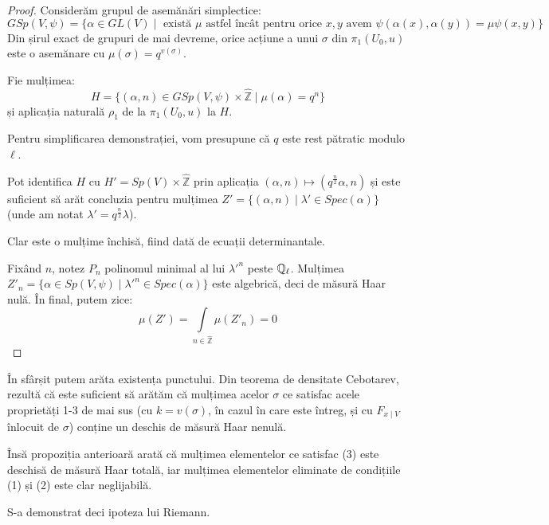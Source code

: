 \documentclass[13pt,openany]{book}
\begin{document}
\begin{proof}
Considerăm grupul de asemănări simplectice:
$$GSp(V,\psi)=\{\alpha\in GL(V) \mid \text{ există } \mu \text{ astfel încât pentru orice } x,y \text{ avem } \psi(\alpha(x),\alpha(y))=\mu\psi(x,y)\}$$
Din șirul exact de grupuri de mai devreme, orice acțiune a unui $\sigma$ din $\pi_1(U_0,u)$ este o asemănare cu $\mu(\sigma)=q^{v(\sigma)}$.

Fie mulțimea:
$$H=\{(\alpha,n)\in GSp(V,\psi) \times \hat{\mathbb{Z}} \mid \mu(\alpha)=q^n\}$$
și aplicația naturală $\rho_1$ de la $\pi_1(U_0,u)$ la $H$.

Pentru simplificarea demonstrației, vom presupune că $q$ este rest pătratic modulo $\ell$.

Pot identifica $H$ cu $H'=Sp(V) \times \hat{\mathbb{Z}}$ prin aplicația $(\alpha,n)\mapsto(q^{\frac{n}{2}}\alpha,n)$ și este suficient să arăt concluzia pentru mulțimea $Z'=\{(\alpha,n)\mid\lambda'\in Spec(\alpha)\}$ (unde am notat $\lambda'=q^{\frac{n}{2}}\lambda$).

Clar este o mulțime închisă, fiind dată de ecuații determinantale.

Fixând $n$, notez $P_n$ polinomul minimal al lui $\lambda'^n$ peste $\mathbb{Q}_\ell$. Mulțimea $Z'_n=\{\alpha\in Sp(V,\psi)\mid \lambda'^n \in Spec(\alpha)\}$ este algebrică, deci de măsură Haar nulă. În final, putem zice:
$$\mu(Z')=\int\limits_{n \in \hat{\mathbb{Z}}} \mu(Z'_n) = 0$$
\end{proof}

În sfârșit putem arăta existența punctului. Din teorema de densitate Cebotarev, rezultă că este suficient să arătăm că mulțimea acelor $\sigma$ ce satisfac acele proprietăți 1-3 de mai sus (cu $k=v(\sigma)$, în cazul în care este întreg, și cu $F_{x\mid V}$ înlocuit de $\sigma$) conține un deschis de măsură Haar nenulă.

Însă propoziția anterioară arată că mulțimea elementelor ce satisfac (3) este deschisă de măsură Haar totală, iar mulțimea elementelor eliminate de condițiile (1) și (2) este clar neglijabilă.

S-a demonstrat deci ipoteza lui Riemann.






















\end{document}
